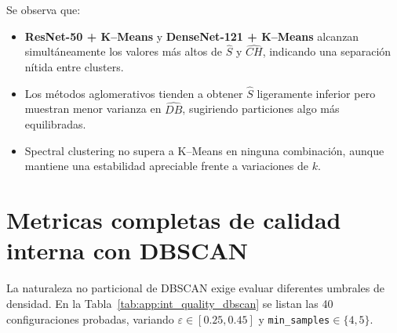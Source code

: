 Se observa que:

\begin{itemize}
  \item \textbf{ResNet-50 + K–Means} y \textbf{DenseNet-121 + K–Means}
        alcanzan simultáneamente los valores más altos de \(\widehat S\) y
        \(\widehat{CH}\), indicando una separación nítida entre clusters.
  \item Los métodos aglomerativos tienden a obtener \(\widehat S\) ligeramente
        inferior pero muestran menor varianza en \(\widehat{DB}\),
        sugiriendo particiones algo más equilibradas.
  \item Spectral clustering no supera a K–Means en ninguna combinación,
        aunque mantiene una estabilidad apreciable frente a variaciones de \(k\).
\end{itemize}

\section{Metricas completas de calidad interna con DBSCAN}

La naturaleza no particional de DBSCAN exige evaluar diferentes umbrales de densidad.
En la Tabla~\ref{tab:app:int_quality_dbscan} se listan las 40 configuraciones probadas, variando \(\varepsilon\in[0.25,0.45]\) y \texttt{min\_samples}\(\in\{4,5\}\).

